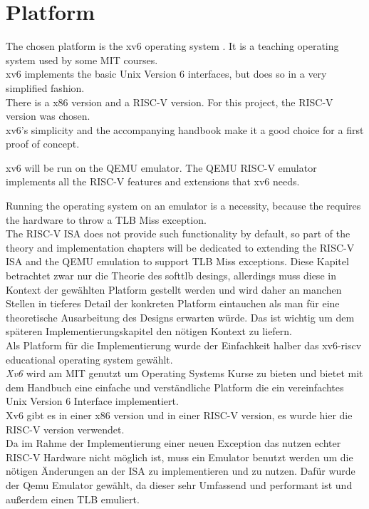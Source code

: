 
\section{Platform}
The chosen platform is the xv6 operating system \cite{xv6source}. It is a teaching operating system
used by some MIT courses.\\
xv6 implements the basic Unix Version 6 interfaces, but does so in a very simplified fashion.\\
There is a x86 version and a RISC-V version. For this project, the RISC-V version was chosen.\\
xv6's simplicity and the accompanying handbook \cite{cox2011xv6} make it a good choice for a first
proof of concept.

xv6 will be run on the QEMU \cite{QEMUSource2024} emulator. The QEMU RISC-V emulator implements
all the RISC-V features and extensions that xv6 needs.

Running the operating system on an emulator is a necessity, because the requires the hardware to
throw a TLB Miss exception.\\ The RISC-V ISA does not provide such functionality by default, so
part of the theory and implementation chapters will be dedicated to extending the RISC-V ISA and
the QEMU emulation to support TLB Miss exceptions.
Diese Kapitel betrachtet zwar nur die Theorie des softtlb desings, allerdings muss diese in Kontext
der gewählten Platform gestellt werden und wird daher an manchen Stellen in tieferes Detail der konkreten
Platform eintauchen als man für eine theoretische Ausarbeitung des Designs erwarten würde.
Das ist wichtig um dem späteren Implementierungskapitel den nötigen Kontext zu liefern.\\
Als Platform für die Implementierung wurde der Einfachkeit halber das xv6-riscv educational operating
system \cite{cox2011xv6} gewählt.\\
\textit{Xv6} wird am MIT genutzt um Operating Systems Kurse zu bieten und bietet mit dem Handbuch eine
einfache und verständliche Platform die ein vereinfachtes Unix Version 6 Interface implementiert.\\
Xv6 gibt es in einer x86 version und in einer RISC-V version, es wurde hier die RISC-V version verwendet.
\\
Da im Rahme der Implementierung einer neuen Exception das nutzen echter RISC-V Hardware nicht möglich
ist, muss ein Emulator benutzt werden um die nötigen Änderungen an der ISA zu implementieren und zu nutzen.
Dafür wurde der Qemu Emulator gewählt, da dieser sehr Umfassend und performant ist und außerdem einen
TLB emuliert.

